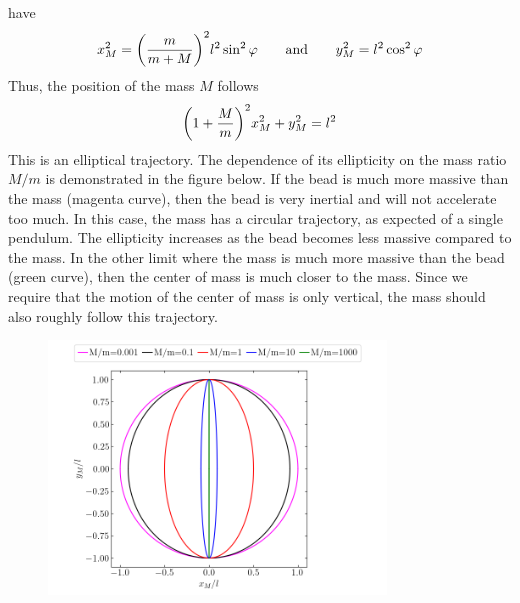 \documentclass[12pt]{article}
\begin{document}
\begin{problem}{1}
\begin{solution}
    have
    \begin{equation}
        x_M^2=\qty(\frac{m}{m+M})^2l^2\sin^2\varphi
        \qquad\text{and}\qquad
        y_M^2=l^2\cos^2\varphi
    \end{equation}
    Thus, the position of the mass $M$ follows
    \begin{equation}
        \qty(1+\frac{M}{m})^2x_M^2+y_M^2=l^2 
    \end{equation}
    This is an elliptical trajectory. The dependence of its ellipticity on the
    mass ratio $M/m$ is demonstrated in the figure below. If the bead is much
    more massive than the mass (magenta curve), then the bead is very inertial
    and will not accelerate too much. In this case, the mass has a circular
    trajectory, as expected of a single pendulum. The ellipticity increases as
    the bead becomes less massive compared to the mass. In the other limit where
    the mass is much more massive than the bead (green curve), then the center
    of mass is much closer to the mass. Since we require that the motion of the
    center of mass is only vertical, the mass should also roughly follow this
    trajectory.
    \begin{figure}[h]
        \centering
        \includegraphics[width=0.8\textwidth]{p1.png}
    \end{figure}
\end{solution}
\end{problem}
\end{document}
